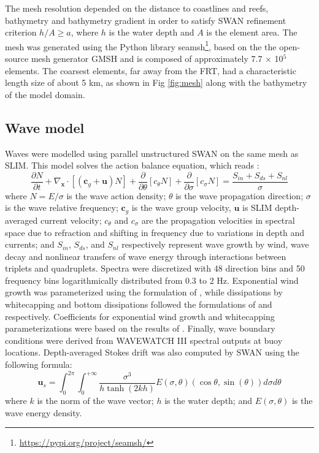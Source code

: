 \documentclass[11pt,a4paper]{article}
\begin{document}
The mesh resolution depended on the distance to coastlines and reefs, bathymetry and bathymetry gradient in order to satisfy SWAN refinement criterion $h/A\geq a$, where $h$ is the water depth and $A$ is the element area. The mesh was generated using the Python library seamsh\footnote{\url{https://pypi.org/project/seamsh/}}, based on the the open-source mesh generator GMSH \citep{geuzaine2009gmsh} and is composed of approximately 7.7 $\times$ 10$^5$ elements. The coarsest elements, far away from the FRT, had a characteristic length size of about 5 km, as shown in Fig \ref{fig:mesh} along with the bathymetry of the model domain.

\subsection{Wave model}
Waves were modelled using parallel unstructured SWAN \citep{booij1999third} on the same mesh as SLIM. This model solves the action balance equation, which reads \citep{mei1989applied}:
\begin{equation}
    \dfrac{\partial N}{\partial t} + \nabla_\mathbf{x}\cdot[(\mathbf{c}_g+\mathbf{u})N] + \dfrac{\partial }{\partial \theta}[c_\theta N] + \dfrac{\partial}{\partial \sigma}[c_\sigma N] = \dfrac{S_{in}+S_{ds}+S_{nl}}{\sigma} \label{eq:swan}
\end{equation}
where $N=E/\sigma$ is the wave action density; $\theta$ is the wave propagation direction; $\sigma$ is the wave relative frequency; $\mathbf{c}_g$ is the wave group velocity, $\mathbf{u}$ is SLIM depth-averaged current velocity; $c_\theta$ and $c_\sigma$ are the propagation velocities in spectral space due to refraction and shifting in frequency due to variations in depth and currents; and $S_{in}$, $S_{ds}$, and $S_{nl}$ respectively represent wave growth by wind, wave decay and nonlinear transfers of wave energy through interactions between triplets and quadruplets. Spectra were discretized with 48 direction bins and 50 frequency bins logarithmically distributed from 0.3 to 2 Hz. Exponential wind growth was parameterized using the formulation of \cite{janssen1991quasi}, while dissipations by whitecapping and bottom dissipations followed the formulations of \cite{komen1984existence} and \cite{madsen1989spectral} respectively. Coefficients for exponential wind growth and whitecapping parameterizations were based on the results of \cite{siadatmousavi2011evaluation}. Finally, wave boundary conditions were derived from WAVEWATCH III \citep{tolman2009user} spectral outputs at buoy locations. Depth-averaged Stokes drift was also computed by SWAN using the following formula:
\begin{equation}
    \mathbf{u}_{s} = \int_0^{2\pi}\int_0^{+\infty} \dfrac{\sigma^3}{h\tanh(2kh)}E(\sigma,\theta)(\cos\theta, \sin(\theta))d\sigma d\theta
\end{equation}
where $k$ is the norm of the wave vector; $h$ is the water depth; and $E(\sigma,\theta)$ is the wave energy density.
\end{document}
